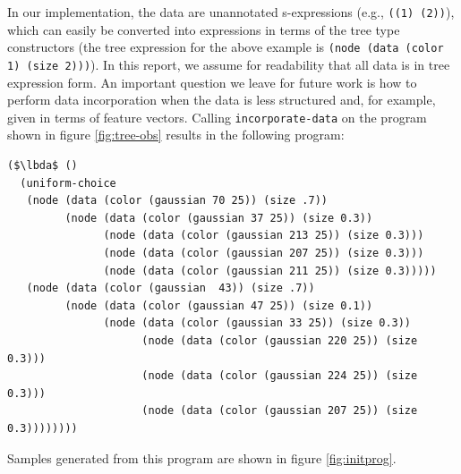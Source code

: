 \documentclass[a4paper,10pt]{article}
\newcommand{\lbda}{\color[rgb]{0,.3,.7} \lambda}
\begin{document}
In our implementation, the data are unannotated s-expressions (e.g., \texttt{((1) (2))}), which can easily be converted into expressions in terms of the tree type constructors (the tree expression for the above example is \texttt{(node (data (color 1) (size 2)))}).  In this report, we assume for readability that all data is in tree expression form. An important question we leave for future work is how to perform data incorporation when the data is less structured and, for example, given in terms of feature vectors. Calling \texttt{incorporate-data} on the program shown in figure \ref{fig:tree-obs} results in the following program:
\begin{lstlisting}[mathescape=true]
($\lbda$ ()
  (uniform-choice
   (node (data (color (gaussian 70 25)) (size .7))
         (node (data (color (gaussian 37 25)) (size 0.3))
               (node (data (color (gaussian 213 25)) (size 0.3)))
               (node (data (color (gaussian 207 25)) (size 0.3)))
               (node (data (color (gaussian 211 25)) (size 0.3)))))
   (node (data (color (gaussian  43)) (size .7))
         (node (data (color (gaussian 47 25)) (size 0.1))
               (node (data (color (gaussian 33 25)) (size 0.3))
                     (node (data (color (gaussian 220 25)) (size 0.3)))
                     (node (data (color (gaussian 224 25)) (size 0.3)))
                     (node (data (color (gaussian 207 25)) (size 0.3))))))))
\end{lstlisting}
Samples generated from this program are shown in figure \ref{fig:initprog}.
\end{document}
